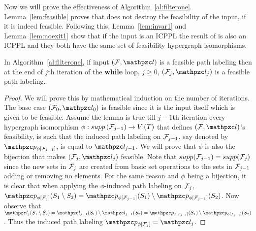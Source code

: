 Now we will prove the effectiveness of Algorithm~\ref{al:filterone}.
Lemma~\ref{lem:feasible} proves that \filteri does not destroy
the feasibility of the input, if it is indeed feasible. Following
this, Lemma~\ref{lem:invar1} and Lemma~\ref{lem:noexit1} show that if
the input is an ICPPL the result of \filteri is also an ICPPL
and they both have the same set of feasibility hypergraph
isomorphisms.

\begin{lemma}
  \label{lem:feasible}
  In Algorithm~\ref{al:filterone}, if input $(\cF, \cl)$ is a feasible path
  labeling then at the end of $j$th iteration of the {\bf while}
  loop, $j \ge 0$, $(\cF_j, \cl_j)$ is a feasible path labeling.
\end{lemma}
\begin{proof}\thesisspacing
  We will prove this by mathematical induction on the number of
  iterations. The base case $(\cF_0, \cl_0)$ is feasible since it is
  the input itself which is given to be feasible. Assume the lemma is
  true till $j-1$th iteration \ie every hypergraph isomorphism $\phi:
  supp\left({\cal F}_{j-1}\right) \rightarrow V\left(T \right)$ that
  defines $(\cF, \cl)$'s feasibility, is such that the induced path
  labeling on ${\cal F}_{j-1}$, say denoted by $\cp_{\phi[{\cF_{j-1}}]}$,
  is equal to $\cl_{j-1}$.
  We will prove that $\phi$ is also the bijection that makes $(\cF_j,
  \cl_j)$ feasible. Note that $supp({\cal F}_{j-1}) = supp({\cal F}_{j})$ since
  the new sets in ${\cal F}_j$ are created from basic set operations to the
  sets in ${\cal F}_{j-1}$ adding or removing no elements. For the same
  reason and $\phi$ being a bijection, it is clear that when applying
  the $\phi$-induced path labeling on ${\cal F}_j$, $
  \cp_{\phi[{\cF_{j}}]}(S_1 \setminus S_2) =
  \cp_{\phi[{\cF_{j-1}}]}(S_1) \setminus
  \cp_{\phi[{\cF_{j-1}}]}(S_2)$. Now observe that $ \cl_j(S_1
  \setminus S_2) = \cl_{j-1}(S_1) \setminus \cl_{j-1}(S_2) =
  \cp_{\phi[{\cF_{j-1}}]}(S_1) \setminus
  \cp_{\phi[{\cF_{j-1}}]}(S_2)$. Thus the induced path labeling
  $\cp_{\phi[{\cF_{j}}]} = \cl_{j}$.  %
\end{proof}

